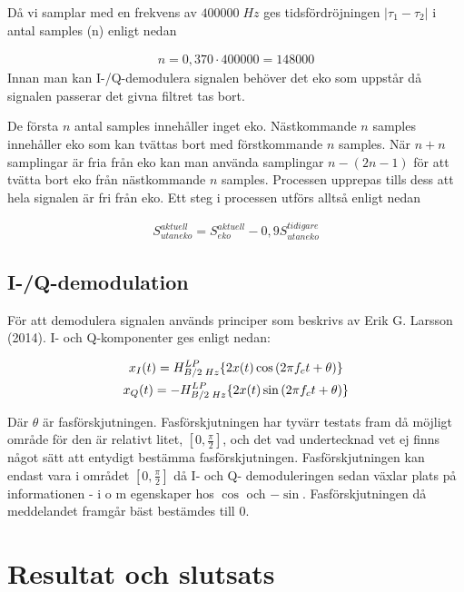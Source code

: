 \documentclass[10pt,twocolumn]{article}
\begin{document}
Då vi samplar med en frekvens av $400 000\;Hz$ ges tidsfördröjningen $|\tau_1 - \tau_2|$ i antal samples (n) enligt nedan 

\begin{gather}
n = 0,370 \cdot 400 000 = 148 000
\label{equ:delaySamples}
\end{gather}
Innan man kan I-/Q-demodulera signalen behöver det eko som uppstår då signalen passerar det givna filtret tas bort. 

De första $n$ antal samples innehåller inget eko. Nästkommande $n$ samples innehåller eko som kan tvättas bort med förstkommande $n$ samples. När $n+n$ samplingar är fria från eko kan man använda samplingar $n-(2n-1)$ för att tvätta bort eko från nästkommande $n$ samples. Processen upprepas tills dess att hela signalen är fri från eko. Ett steg i processen utförs alltså enligt nedan

\begin{gather}
S_{utan eko}^{aktuell} = S_{eko}^{aktuell} - 0,9S_{utan eko}^{tidigare}
\label{equ:eko}
\end{gather}

\subsection{I-/Q-demodulation}

För att demodulera signalen används principer som beskrivs av Erik G. Larsson (2014). I- och Q-komponenter ges enligt nedan: 

\begin{gather}
x_{I}(t) = \Large{H}_{B/2\;Hz}^{LP}\{2x(t)\cos{(2{\pi}f_{c}t + \theta)}\} \\
x_{Q}(t) = -\Large{H}_{B/2\;Hz}^{LP}\{2x(t)\sin{(2{\pi}f_{c}t + \theta)}\}
\label{equ:iq}
\end{gather}

Där $\theta$ är fasförskjutningen. Fasförskjutningen har tyvärr testats fram då möjligt område för den är relativt litet, $[0,\frac{\pi}{2}]$, och det vad undertecknad vet ej finns något sätt att entydigt bestämma fasförskjutningen. Fasförskjutningen kan endast vara i området $[0,\frac{\pi}{2}]$ då I- och Q- demoduleringen sedan växlar plats på informationen - i o m egenskaper hos $\cos$ och $-\sin$. Fasförskjutningen då meddelandet framgår bäst bestämdes till $0$.


\section{Resultat och slutsats}
\end{document}
